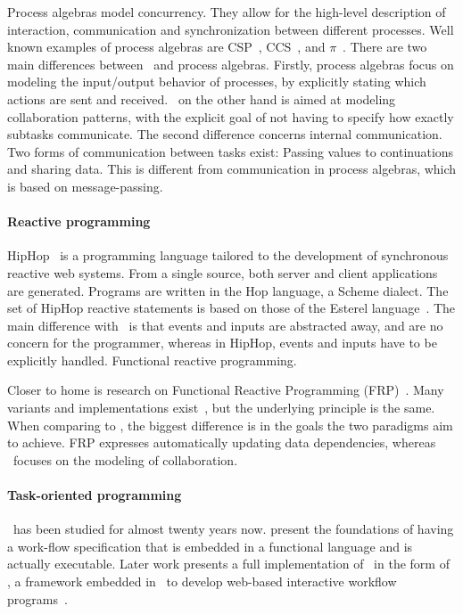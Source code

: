 Process algebras model concurrency.
They allow for the high-level description of interaction, communication and synchronization between different processes.
Well known examples of process algebras are CSP~\cite{books/ph/Hoare85}, CCS~\cite{books/ph/Milner89}, and $\pi$~\cite{DBLP:books/daglib/0098267}.
There are two main differences between \TOP\ and process algebras.
Firstly, process algebras focus on modeling the input/output behavior of processes, by explicitly stating which actions are sent and received.
\TOP\ on the other hand is aimed at modeling collaboration patterns, with the explicit goal of not having to specify how exactly subtasks communicate.
The second difference concerns internal communication.
Two forms of communication between tasks exist: Passing values to continuations and sharing data.
This is different from communication in process algebras, which is based on message-passing.

\paragraph{Reactive programming}
HipHop~\cite{conf/icdcit/BerryS14,journals/corr/BerryS13} is a programming language tailored to the development of synchronous reactive web systems.
From a single source, both server and client applications are generated.
Programs are written in the Hop language, a Scheme dialect.
The set of HipHop reactive statements is based on those of the Esterel language~\cite{journals/scp/BerryG9}.
The main difference with \TOPHAT\ is that events and inputs are abstracted away, and are no concern for the programmer, whereas in HipHop, events and inputs have to be explicitly handled.
Functional reactive programming.

Closer to home is research on Functional Reactive Programming (FRP)~\cite{conf/icfp/ElliottH97}.
Many variants and implementations exist~\cite{reactive-banana,CooperK04,conf/oopsla/MeyerovichGBCGBK09}, but the underlying principle is the same.
When comparing to \TOP, the biggest difference is in the goals the two paradigms aim to achieve.
FRP expresses automatically updating data dependencies, whereas \TOP\ focuses on the modeling of collaboration.

\paragraph{Task-oriented programming}

\TOP\ has been studied for almost twenty years now.
\citet{conf/icfp/PlasmeijerAK07} present the foundations of having a work-flow specification that is embedded in a functional language and is actually executable.
Later work presents a full implementation of \TOP\ in the form of \ITASKS, a framework embedded in \CLEAN\ to develop web-based interactive workflow programs~\cite{conf/ppdp/PlasmeijerLMAK12}.

